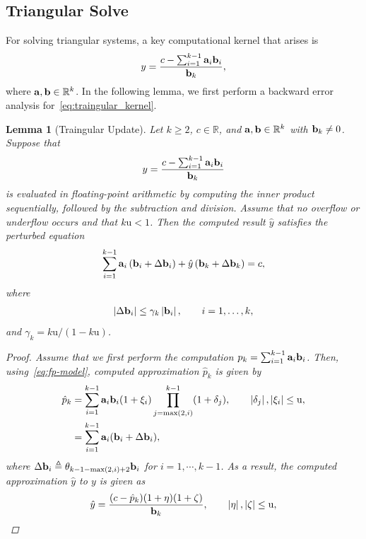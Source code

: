 \documentclass[11pt,draft]{article}
\newcommand{\urd}{\ensuremath{\mathrm{u}}}
\newcommand{\define}{\ensuremath{\triangleq}}
\newcommand{\vect}[1]{\mathbf{\MakeLowercase{#1}}}
\newcommand{\ireal}[1]{\in\mathbb{R}^{#1}}
\newtheorem{lemma}[theorem]{Lemma}
\theoremstyle{definition}
\theoremstyle{remark}
\newcommand{\R}{\mathbb{R}}
\newcommand{\abs}[1]{\left|#1\right|}
\begin{document}
\subsection{Triangular Solve}
For solving triangular systems, a key computational kernel that arises is 
\begin{align}\label{eq:traingular_kernel}
    y = \frac{c - \sum_{i=1}^{k-1}\vect{a}_i\vect{b}_i}{\vect{b}_k},
\end{align}
where $\vect{a},\vect{b}\ireal{k}$.
In the following lemma, we first perform a backward error analysis for~\cref{eq:traingular_kernel}.
\begin{lemma}[Traingular Update]\label{lemma:traingular_update}
Let $k\geq2$, $c\in\R$, and $\vect{a},\vect{b}\ireal{k}$ with
$\vect{b}_k\neq0$. Suppose that
\begin{align}
    y=\frac{c-\sum_{i=1}^{k-1}\vect{a}_i\vect{b}_i}{\vect{b}_k}
\end{align}
is evaluated in floating-point arithmetic by computing the inner product
sequentially, followed by the subtraction and division. Assume that no
overflow or underflow occurs and that $k\urd<1$. Then the computed result
$\hat{y}$ satisfies the perturbed equation
\begin{align}
    \sum_{i=1}^{k-1}
        \vect{a}_i\left(\vect{b}_i+\Delta\vect{b}_i\right)
    +\hat{y}\left(\vect{b}_k+\Delta\vect{b}_k\right)
    =c,
\end{align}
where
\begin{align}
    \abs{\Delta\vect{b}_i}
    \leq \gamma_k\abs{\vect{b}_i},
    \qquad i=1,\ldots,k,
\end{align}
and $\gamma_k=k\urd/(1-k\urd)$.
\begin{proof}
   Assume that we first perform the computation $p_k = \sum_{i=1}^{k-1} \vect{a}_i\vect{b}_i$.
   Then, using~\cref{eq:fp-model}, computed approximation $\hat{p}_k$ is given by
   \begin{align}
    \hat{p}_k &= \sum_{i=1}^{k-1}\vect{a}_i\vect{b}_i (1+\xi_i) \prod_{j=\max(2,i)}^{k-1} (1+\delta_j), \qquad \abs{\delta_j},\abs{\xi_i} \leq \urd,\\
     &= \sum_{i=1}^{k-1} \vect{a}_i (\vect{b}_i + \Delta \vect{b}_i),
   \end{align}
   where $\Delta \vect{b}_i \define \theta_{k-1 - \max(2, i) + 2}\vect{b}_i$ for $i=1,\cdots, k-1$.
   As a result, the computed approximation $\hat{y}$ to $y$ is given as
   \begin{align}
    \hat{y} &= \frac{(c - \hat{p}_k)(1+\eta)(1 + \zeta)}{\vect{b}_k}, \qquad \abs{\eta},\abs{\zeta} \leq \urd,\\

\end{align}
\end{proof}
\end{lemma}
\end{document}
